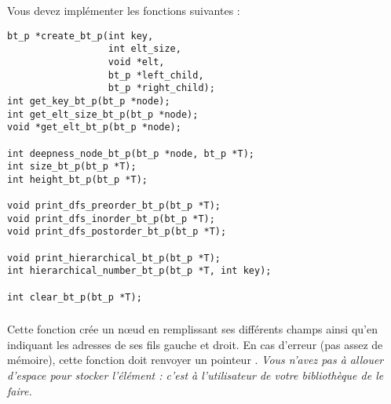 


\bigskip

\noindent Vous devez implémenter les fonctions suivantes :

\bigskip

\lstset{language=C}
\begin{lstlisting}[frame=single]
bt_p *create_bt_p(int key,
                  int elt_size,
                  void *elt,
                  bt_p *left_child,
                  bt_p *right_child);
int get_key_bt_p(bt_p *node);
int get_elt_size_bt_p(bt_p *node);
void *get_elt_bt_p(bt_p *node);

int deepness_node_bt_p(bt_p *node, bt_p *T);
int size_bt_p(bt_p *T);
int height_bt_p(bt_p *T);

void print_dfs_preorder_bt_p(bt_p *T);
void print_dfs_inorder_bt_p(bt_p *T);
void print_dfs_postorder_bt_p(bt_p *T);

void print_hierarchical_bt_p(bt_p *T);
int hierarchical_number_bt_p(bt_p *T, int key);

int clear_bt_p(bt_p *T);
\end{lstlisting}


\subsubsection*{}

\noindent Cette fonction crée un nœud en remplissant ses différents champs ainsi qu'en indiquant les adresses de ses fils gauche et droit.
En cas d'erreur (pas assez de mémoire), cette fonction doit renvoyer un pointeur .
\textit{Vous n'avez pas à allouer d'espace pour stocker l'élément  : c'est à l'utilisateur de votre bibliothèque de le faire.}

\subsubsection*{}

